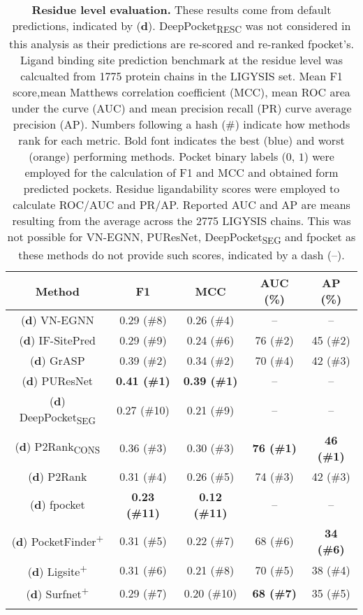 \begin{longtable}[c]{|c|c|c|c|c|}
\hline
\textbf{Method}         & \textbf{F1}   & \textbf{MCC}  & \textbf{AUC} (\%)  & \textbf{AP} (\%)   \\ \hline
\endfirsthead
%
\footnotesize{(\textbf{d})} VN-EGNN        & 0.29 (\#8) & 0.26 (\#4) & --    & --    \\ \hline
\footnotesize{(\textbf{d})} IF-SitePred    & 0.29 (\#9) & 0.24 (\#6) & 76 (\#2)  & 45 (\#2) \\ \hline
\footnotesize{(\textbf{d})} GrASP          & 0.39 (\#2) & 0.34 (\#2) & 70 (\#4) & 42 (\#3) \\ \hline
\footnotesize{(\textbf{d})} PUResNet       & \textbf{\textcolor{CBBlue}{0.41 (\#1)}} & \textbf{\textcolor{CBBlue}{0.39 (\#1)}} & --    & --    \\ \hline
\footnotesize{(\textbf{d})} DeepPocket\textsubscript{SEG}  & 0.27 (\#10) & 0.21 (\#9) & --    & --    \\ \hline
\footnotesize{(\textbf{d})} P2Rank\textsubscript{CONS}     & 0.36 (\#3) & 0.30 (\#3)  & \textbf{\textcolor{CBBlue}{76 (\#1)}} & \textbf{\textcolor{CBBlue}{46 (\#1)}} \\ \hline
\footnotesize{(\textbf{d})} P2Rank         & 0.31 (\#4) & 0.26 (\#5) & 74 (\#3) & 42 (\#3) \\ \hline
\footnotesize{(\textbf{d})} fpocket        & \textbf{\textcolor{CBOrange}{0.23 (\#11)}} & \textbf{\textcolor{CBOrange}{0.12 (\#11)}} & --    & --    \\ \hline
\footnotesize{(\textbf{d})} PocketFinder\textsuperscript{+}  & 0.31 (\#5) & 0.22 (\#7) & 68 (\#6) & \textbf{\textcolor{CBOrange}{34 (\#6)}} \\ \hline
\footnotesize{(\textbf{d})} Ligsite\textsuperscript{+}       & 0.31 (\#6) & 0.21 (\#8) & 70 (\#5) & 38 (\#4) \\ \hline
\footnotesize{(\textbf{d})} Surfnet\textsuperscript{+}       & 0.29 (\#7) & 0.20 (\#10)  & \textbf{\textcolor{CBOrange}{68 (\#7)}} & 35 (\#5) \\ \hline
\caption[Residue level evaluation]{\textbf{Residue level evaluation.} These results come from default predictions, indicated by (\textbf{d}). DeepPocket\textsubscript{RESC} was not considered in this analysis as their predictions are re-scored and re-ranked fpocket's. Ligand binding site prediction benchmark at the residue level was calcualted from 1775 protein chains in the LIGYSIS set. Mean F1 score,mean Matthews correlation coefficient (MCC), mean ROC area under the curve (AUC) and mean precision recall (PR) curve average precision (AP). Numbers following a hash (\#) indicate how methods rank for each metric. Bold font indicates the best (blue) and worst (orange) performing methods. Pocket binary labels ($0$, $1$) were employed for the calculation of F1 and MCC and obtained form predicted pockets. Residue ligandability scores were employed to calculate ROC/AUC and PR/AP. Reported AUC and AP are means resulting from the average across the 2775 LIGYSIS chains. This was not possible for VN-EGNN, PUResNet, DeepPocket\textsubscript{SEG} and fpocket as these methods do not provide such scores, indicated by a dash (--).}

\end{longtable}
